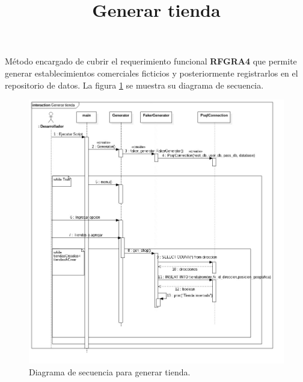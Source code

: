 \title{\textbf{Generar tienda}}
\FloatBarrier
Método encargado de cubrir el requerimiento funcional \textbf{RFGRA4} que permite generar establecimientos comerciales ficticios y posteriormente registrarlos en el repositorio de datos. La figura \ref{image:DSGenerarTienda} se muestra su diagrama de secuencia. 
\begin{figure}[htbp!]
		\centering
			\includegraphics[width=1 \textwidth]{imagenes/DSRuben/gen_shop_generator}
		\caption{Diagrama de secuencia para generar tienda.}
		\label{image:DSGenerarTienda}
\end{figure}
\FloatBarrier






